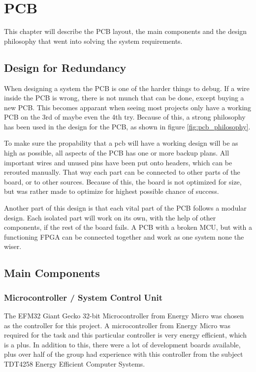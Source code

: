\documentclass[../main/report.tex]{subfiles}
\begin{document}
\chapter{PCB}
\label{sec:pcb}

This chapter will describe the PCB layout, the main components and the design philosophy that went into solving the system requirements.


\section{Design for Redundancy}

When designing a system the PCB is one of the harder things to debug.
If a wire inside the PCB is wrong, there is not munch that can be done, except buying a new PCB.
This becomes apparant when seeing most projects only have a working PCB on the 3rd of maybe even the 4th try.
Because of this, a strong philosophy has been used in the design for the PCB, as shown in figure \ref{fig:pcb_philosophy}.

To make sure the propability that a pcb will have a working design will be as high as possible, all aspects of the PCB has one or more backup plans.
All important wires and unused pins have been put onto headers, which can be rerouted manually.
That way each part can be connected to other parts of the board, or to other sources.
Because of this, the board is not optimized for size, but was rather made to optimize for highest possible chance of success.

Another part of this design is that each vital part of the PCB follows a modular design.
Each isolated part will work on its own, with the help of other components, if the rest of the board fails.
A PCB with a broken MCU, but with a functioning FPGA can be connected together and work as one system none the wiser.

\section{Main Components}

\subsection{Microcontroller / System Control Unit}
The EFM32 Giant Gecko 32-bit Microcontroller from Energy Micro was chosen as the controller for this project.
A microcontroller from Energy Micro was required for the task and this particular controller is
very energy efficient, which is a plus.
In addition to this, there were a lot of development boards available,
plus over half of the group had experience with this controller from the subject
TDT4258 Energy Efficient Computer Systems.
\end{document}
